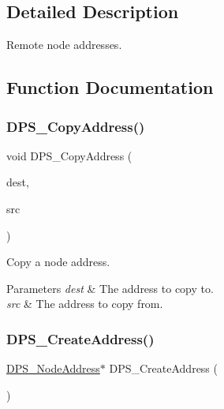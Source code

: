 \subsection{Detailed Description}
Remote node addresses. 



\subsection{Function Documentation}
\mbox{\label{group__nodeaddress_gace91591af9bf2a99bad07deda1b9176c}} 
\subsubsection{\texorpdfstring{D\+P\+S\+\_\+\+Copy\+Address()}{DPS\_CopyAddress()}}
{\footnotesize\ttfamily void D\+P\+S\+\_\+\+Copy\+Address (\begin{DoxyParamCaption}\item[{\hyperlink{group__nodeaddress_ga9e9f56aa38e82b4edcef7eb81e9f5bd2}{D\+P\+S\+\_\+\+Node\+Address} $\ast$}]{dest,  }\item[{const \hyperlink{group__nodeaddress_ga9e9f56aa38e82b4edcef7eb81e9f5bd2}{D\+P\+S\+\_\+\+Node\+Address} $\ast$}]{src }\end{DoxyParamCaption})}



Copy a node address. 


\begin{DoxyParams}{Parameters}
{\em dest} & The address to copy to. \\
\hline
{\em src} & The address to copy from. \\
\hline
\end{DoxyParams}
\mbox{\label{group__nodeaddress_ga6bed18a4b0ad533ec88c7a0d376de818}} 
\subsubsection{\texorpdfstring{D\+P\+S\+\_\+\+Create\+Address()}{DPS\_CreateAddress()}}
{\footnotesize\ttfamily \hyperlink{group__nodeaddress_ga9e9f56aa38e82b4edcef7eb81e9f5bd2}{D\+P\+S\+\_\+\+Node\+Address}$\ast$ D\+P\+S\+\_\+\+Create\+Address (\begin{DoxyParamCaption}{ }\end{DoxyParamCaption})}



